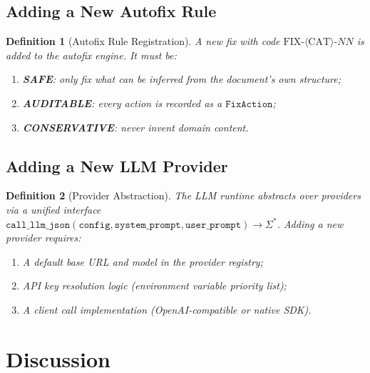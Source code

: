 \documentclass[11pt,a4paper]{article}
\newtheorem{definition}{Definition}[section]
\theoremstyle{definition}
\begin{document}
\subsection{Adding a New Autofix Rule}
\begin{definition}[Autofix Rule Registration]
A new fix with code $\text{FIX-}\langle\text{CAT}\rangle\text{-}NN$ is added to the autofix engine. It must be:
\begin{enumerate}[label=(\alph*),leftmargin=*]
    \item \textbf{SAFE}: only fix what can be inferred from the document's own structure;
    \item \textbf{AUDITABLE}: every action is recorded as a $\texttt{FixAction}$;
    \item \textbf{CONSERVATIVE}: never invent domain content.
\end{enumerate}
\end{definition}

\subsection{Adding a New LLM Provider}
\begin{definition}[Provider Abstraction]
The LLM runtime abstracts over providers via a unified interface $\texttt{call\_llm\_json}(\texttt{config}, \texttt{system\_prompt}, \texttt{user\_prompt}) \to \Sigma^*$. Adding a new provider requires:
\begin{enumerate}[label=(\alph*),leftmargin=*]
    \item A default base URL and model in the provider registry;
    \item API key resolution logic (environment variable priority list);
    \item A client call implementation (OpenAI-compatible or native SDK).
\end{enumerate}
\end{definition}

\section{Discussion}
\end{document}
